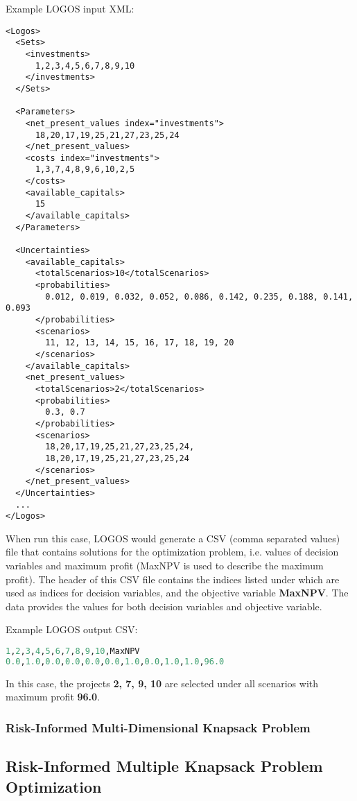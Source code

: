 Example LOGOS input XML:
\begin{lstlisting}[style=XML]
<Logos>
  <Sets>
    <investments>
      1,2,3,4,5,6,7,8,9,10
    </investments>
  </Sets>

  <Parameters>
    <net_present_values index="investments">
      18,20,17,19,25,21,27,23,25,24
    </net_present_values>
    <costs index="investments">
      1,3,7,4,8,9,6,10,2,5
    </costs>
    <available_capitals>
      15
    </available_capitals>
  </Parameters>

  <Uncertainties>
    <available_capitals>
      <totalScenarios>10</totalScenarios>
      <probabilities>
        0.012, 0.019, 0.032, 0.052, 0.086, 0.142, 0.235, 0.188, 0.141, 0.093
      </probabilities>
      <scenarios>
        11, 12, 13, 14, 15, 16, 17, 18, 19, 20
      </scenarios>
    </available_capitals>
    <net_present_values>
      <totalScenarios>2</totalScenarios>
      <probabilities>
        0.3, 0.7
      </probabilities>
      <scenarios>
        18,20,17,19,25,21,27,23,25,24,
        18,20,17,19,25,21,27,23,25,24
      </scenarios>
    </net_present_values>
  </Uncertainties>
  ...
</Logos>
\end{lstlisting}

When run this case, LOGOS would generate a CSV (comma separated values) file that
contains solutions for the optimization problem, i.e. values of decision variables
and maximum profit (MaxNPV is used to describe the maximum profit). The header of
this CSV file contains the indices listed under  which are
used as indices for decision variables, and the objective variable \textbf{MaxNPV}.
The data provides the values for both decision variables and objective variable.

Example LOGOS output CSV:
\begin{lstlisting}[language=python]
1,2,3,4,5,6,7,8,9,10,MaxNPV
0.0,1.0,0.0,0.0,0.0,0.0,1.0,0.0,1.0,1.0,96.0
\end{lstlisting}

In this case, the projects \textbf{2, 7, 9, 10} are selected under all scenarios
with maximum profit \textbf{96.0}.


\subsubsection{Risk-Informed Multi-Dimensional Knapsack Problem}



\subsection{Risk-Informed Multiple Knapsack Problem Optimization}
\label{subsec:RImkp}


